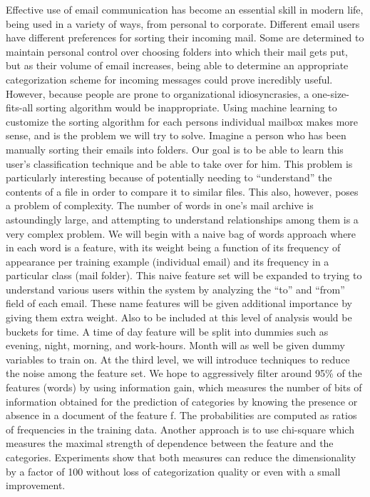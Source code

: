 \documentclass[11pt]{article}
\begin{document}
Effective use of email communication has become an essential skill in modern life, being used in a variety of ways, from personal to corporate.  Different email users have different preferences for sorting their incoming mail.  Some are determined to maintain personal control over choosing folders into which their mail gets put, but as their volume of email increases, being able to determine an appropriate categorization scheme for incoming messages could prove incredibly useful.  However, because people are prone to organizational idiosyncrasies, a one-size-fits-all sorting algorithm would be inappropriate.  Using machine learning to customize the sorting algorithm for each persons individual mailbox makes more sense, and is the problem we will try to solve.
Imagine a person who has been manually sorting their emails into folders. Our goal is to be able to learn this user’s classification technique and be able to take over for him. This problem is particularly interesting because of potentially needing to “understand” the contents of a file in order to compare it to similar files. This also, however, poses a problem of complexity. The number of words in one’s mail archive is astoundingly large, and attempting to understand relationships among them is a very complex problem.
We will begin with a naive bag of words approach where in each word is a feature, with its weight being a function of its frequency of appearance per training example (individual email) and its frequency in a particular class (mail folder). This naive feature set will be expanded to trying to understand various users within the system by analyzing the “to” and “from” field of each email. These name features will be given additional importance by giving them extra weight. Also to be included at this level of analysis would be buckets for time. A time of day feature will be split into dummies such as evening, night, morning, and work-hours. Month will as well be given dummy variables to train on.
At the third level, we will introduce techniques to reduce the noise among the feature set. We hope to aggressively filter around 95\% of the features (words) by using information gain, which measures the number of bits of information obtained for the prediction of categories by knowing the presence or absence in a document of the feature f. The probabilities are computed as ratios of frequencies in the training data. Another approach is to use chi-square which measures the maximal strength of dependence between the feature and the categories. Experiments show that both measures can reduce the dimensionality by a factor of 100 without loss of categorization quality or even with a small improvement.
\end{document}
